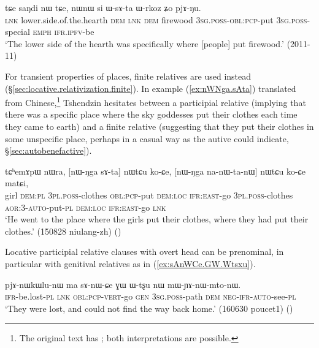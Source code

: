 \begin{exe}
\ex \label{ex:WsAta.Wrkoz}
\gll tɕe saŋdi nɯ tɕe, nɯnɯ si ɯ-sɤ-ta ɯ-rkoz ʑo pjɤ-ŋu. \\
  \textsc{lnk} lower.side.of.the.hearth \textsc{dem} \textsc{lnk} \textsc{dem} firewood \textsc{3sg}.\textsc{poss}-\textsc{obl}:\textsc{pcp}-put \textsc{3sg}.\textsc{poss}-special \textsc{emph} \textsc{ifr}.\textsc{ipfv}-be \\
\glt `The lower side of the hearth was specifically where [people] put firewood.' (2011-11)
\end{exe}


For transient properties of places, finite relatives are used instead (§\ref{sec:locative.relativization.finite}). In example (\ref{ex:nWNga.sAta}) translated from Chinese,\footnote{The original text has ; both interpretations are possible. }  Tshendzin hesitates between a participial relative (implying that there was a specific place where the sky goddesses put their clothes each time they came to earth) and a finite relative (suggesting that they put their clothes in some unspecific place, perhaps in a casual way as the autive  could indicate, §\ref{sec:autobenefactive}).

\begin{exe}
\ex \label{ex:nWNga.sAta}
\gll tɕʰemɤpɯ nɯra, [nɯ-ŋga sɤ-ta] nɯtɕu ko-ɕe, [nɯ-ŋga na-nɯ-ta-nɯ] nɯtɕu ko-ɕe matɕi, \\
girl \textsc{dem}:\textsc{pl} \textsc{3pl}.\textsc{poss}-clothes \textsc{obl}:\textsc{pcp}-put \textsc{dem}:\textsc{loc} \textsc{ifr}:\textsc{east}-go \textsc{3pl}.\textsc{poss}-clothes \textsc{aor}:3\flobv{}-\textsc{auto}-put-\textsc{pl} \textsc{dem}:\textsc{loc} \textsc{ifr}:\textsc{east}-go \textsc{lnk} \\
\glt `He went to the place where the girls put their clothes, where they had put their clothes.' (150828 niulang-zh) ()
\end{exe}

Locative participial relative clauses with overt head can be prenominal, in particular with genitival relatives as in (\ref{ex:sAnWCe.GW.Wtsxu}). 

\begin{exe}
\ex \label{ex:sAnWCe.GW.Wtsxu}
\gll  pjɤ-nɯkɯlu-nɯ ma sɤ-nɯ-ɕe ɣɯ ɯ-tʂu nɯ mɯ-ɲɤ-nɯ-mto-nɯ. \\
\textsc{ifr}-be.lost-\textsc{pl}  \textsc{lnk} \textsc{obl}:\textsc{pcp}-\textsc{vert}-go \textsc{gen} \textsc{3sg}.\textsc{poss}-path \textsc{dem} \textsc{neg}-\textsc{ifr}-\textsc{auto}-see-\textsc{pl} \\
\glt `They were lost, and could not find the way back home.' (160630 poucet1) ()
\end{exe}

